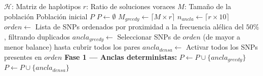 \begin{algorithm}[H]
\caption{Inicialización híbrida de Ting (\textit{greedy\_ting}) (Parte 1)}
\begin{algorithmic}[1]
\Require $\mathcal{H}$: Matriz de haplotipos
\Require $r$: Ratio de soluciones voraces
\Require $M$: Tamaño de la población
\Ensure Población inicial $P$
\State $P \gets \emptyset$ 
\State $M_{greedy} \gets \lceil M \times r \rceil$ 
\State $n_{ancla} \gets \lceil r \times 10 \rceil$ 
\State $orden \gets$ Lista de SNPs ordenados por proximidad a la frecuencia alélica del $50\%$, filtrando duplicados 
\State $ancla_{greedy} \gets$ Seleccionar SNPs de $orden$ (de mayor a menor balance) hasta cubrir todos los pares 
\State $ancla_{densa} \gets$ Activar todos los SNPs presentes en $orden$ 
\State 
\State \textbf{Fase 1 --- Anclas deterministas:}
 
    \State $P \gets P \cup \{ancla_{greedy}\}$ 
    \State $P \gets P \cup \{ancla_{densa}\}$ 
\EndFor
\end{algorithmic}
\end{algorithm}

